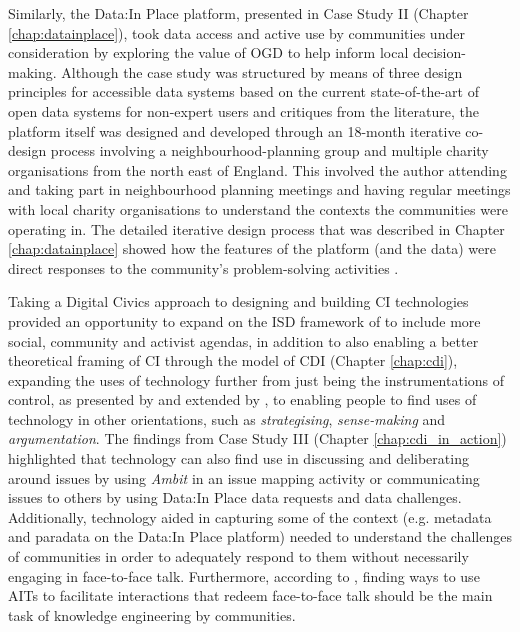Similarly, the Data:In Place platform, presented in Case Study II (Chapter \ref{chap:datainplace}), took data access and active use by communities under consideration by exploring the value of OGD to help inform local decision-making. Although the case study was structured by means of three design principles for accessible data systems based on the current state-of-the-art of open data systems for non-expert users and critiques from the literature, the platform itself was designed and developed through an 18-month iterative co-design process involving a neighbourhood-planning group and multiple charity organisations from the north east of England. This involved the author attending and taking part in neighbourhood planning meetings and having regular meetings with local charity organisations to understand the contexts the communities were operating in. The detailed iterative design process that was described in Chapter \ref{chap:datainplace} showed how the features of the platform (and the data) were direct responses to the community's problem-solving activities \citep{stillman_community_2009}.

Taking a Digital Civics \citep{olivier_digital_2015,vlachokyriakos_digital_2016} approach to designing and building CI technologies provided an opportunity to expand on the ISD framework of \citet{hirschheim_exploring_1996} to include more social, community and activist agendas, in addition to also enabling a better theoretical framing of CI through the model of CDI (Chapter \ref{chap:cdi}), expanding the uses of technology further from just being the instrumentations of control, as presented by \citet{hirschheim_exploring_1996} and extended by \citet{stillman_community_2009}, to enabling people to find uses of technology in other orientations, such as \textit{strategising}, \textit{sense-making} and \textit{argumentation}. The findings from Case Study III (Chapter \ref{chap:cdi_in_action}) highlighted that technology can also find use in discussing and deliberating around issues by using \textit{Ambit} in an issue mapping activity or communicating issues to others by using Data:In Place data requests and data challenges. Additionally, technology aided in capturing some of the context (e.g. metadata and paradata on the Data:In Place platform) needed to understand the challenges of communities in order to adequately respond to them without necessarily engaging in face-to-face talk. Furthermore, according to \citet{hakken_social_2003}, finding ways to use AITs to facilitate interactions that redeem face-to-face talk should be the main task of knowledge engineering by communities.

